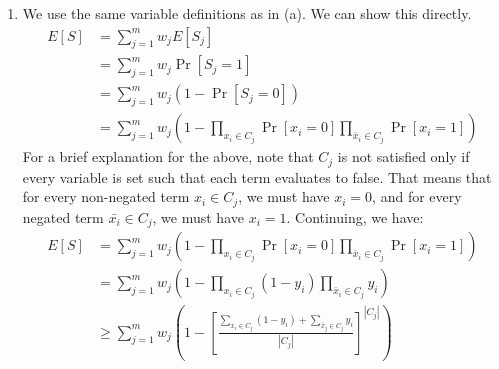 \documentclass[12pt]{exam}
\begin{document}
\begin{questions}
\begin{solution}
\begin{enumerate}[label=(\alph*)]
\begin{proof}
        For the second direction, suppose we have an assignment of the literals $x_i$. Then for each $x_i$ that is \textsc{True}, set $y_i$ to $1$, and $0$ otherwise. For each satisfied disjunction $C_j$, set $z_j$ to $1$ and $0$ otherwise. Note that this satisfies \ref{constraint_max_sat} since each $z_j$ equal to $1$, we must have that at least one of the $x_i, \bar{x}_i \in C_j$ is satsified, implying the sum above is non-empty. If $x_i$ is satisfied, we sum $y_i$ which is $1$, so \ref{constraint_max_sat} holds. If $\bar{x}_i$ is satisfied, we sum $(1-y_i)$ which is $1$, so \ref{constraint_max_sat} holds.

        Note that above transoformations above are objective function preserving.
      \end{proof}

      In conclusion, the 0-1 version of the LP presented above exactly solves the MAX SAT problem. As such, the above LP is a relaxation of the MAX SAT problem.
    \item
      We use the same variable definitions as in (a). We can show this directly. 
      \begin{align*}
        E[S] &= \sum_{j=1}^m w_j E[S_j] \tag{Definition of $S$ and linearity of expectation} \\
        &= \sum_{j=1}^m w_j \Pr[S_j = 1] \tag{Expected value of indicator variable} \\
        &= \sum_{j=1}^m w_j (1 - \Pr[S_j = 0]) \tag{Complement} \\
        &= \sum_{j=1}^m w_j \left(1 - \prod_{x_i \in C_j}\Pr[x_i = 0] \prod_{\bar{x}_i \in C_j}\Pr[x_i = 1] \right) \tag{$C_j$ is not satisfied iff all terms evaluate to false}
      \end{align*}
      For a brief explanation for the above, note that $C_j$ is not satisfied only if every variable is set such that each term evaluates to false. That means that for every non-negated term $x_i \in C_j$, we must have $x_i = 0$, and for every negated term $\bar{x_i} \in C_j$, we must have $x_i = 1$. Continuing, we have:
      \begin{align*}
        E[S] &= \sum_{j=1}^m w_j \left(1 - \prod_{x_i \in C_j}\Pr[x_i = 0] \prod_{\bar{x}_i \in C_j}\Pr[x_i = 1] \right) \tag{From above} \\
        &= \sum_{j=1}^m w_j \left(1 - \prod_{ x_i \in C_j} (1 - y_i) \prod_{\bar{x}_i \in C_j}y_i \right) \tag{$x_i$ is $1$ with probability $y_i$} \\
        &\geq \sum_{j=1}^m w_j \left(1 - \left[\frac{\sum_{x_i \in C_j} (1 - y_i) + \sum_{\bar{x}_j \in C_j} y_i}{|C_j|} \right]^{|C_j|} \right)

\end{align*}
\end{enumerate}
\end{solution}
\end{questions}
\end{document}
